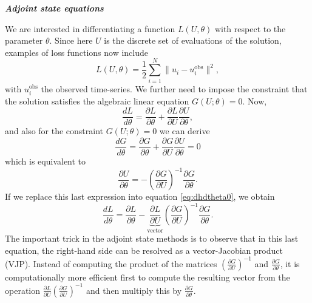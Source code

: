 \vspace*{10px}
\noindent \textbf{\textit{Adjoint state equations}}
\vspace*{5px}

We are interested in differentiating a function $L(U, \theta)$ with respect to the parameter $\theta$. 
Since here $U$ is the discrete set of evaluations of the solution, examples of loss functions now include 
\begin{equation}
    L(U, \theta) 
    = 
    \frac{1}{2} \sum_{i=1}^N \| u_i - u_i^\text{obs} \|^2, 
\end{equation}
with $u_i^\text{obs}$ the observed time-series. 
We further need to impose the constraint that the solution satisfies the algebraic linear equation $G(U; \theta) = 0$.
Now,
\begin{equation}
    \frac{dL}{d\theta} 
    = 
    \frac{\partial L}{\partial \theta} 
    + 
    \frac{\partial L}{\partial U} \frac{\partial U}{\partial \theta},
    \label{eq:dhdtheta0}
\end{equation}
and also for the constraint $G(U; \theta)=0$ we can derive
\begin{equation}
    \frac{dG}{d\theta} 
    = 
    \frac{\partial G}{\partial \theta} 
    + 
    \frac{\partial G}{\partial U} \frac{\partial U}{\partial \theta}
    =
    0
\end{equation}
which is equivalent to 
\begin{equation}
    \frac{\partial U}{\partial \theta} 
    = 
    - \left( \frac{\partial G}{\partial U} \right)^{-1} \frac{\partial G}{\partial \theta}.
\end{equation}
If we replace this last expression into equation \eqref{eq:dhdtheta0}, we obtain
\begin{equation}
    \frac{dL}{d\theta} 
    =
    \frac{\partial L}{\partial \theta} 
    - 
    \underbrace{\frac{\partial L}{\partial U}}_{\text{vector}}
    \left( \frac{\partial G}{\partial U} \right)^{-1} 
    \frac{\partial G}{\partial \theta}.
    \label{eq:dhdtheta}
\end{equation}
The important trick in the adjoint state methods is to observe that in this last equation, the right-hand side can be resolved as a vector-Jacobian product (VJP).
Instead of computing the product of the matrices $\left( \frac{\partial G}{\partial U} \right)^{-1}$ and $\frac{\partial G}{\partial \theta}$, it is computationally more efficient first to compute the resulting vector from the operation $\frac{\partial L}{\partial U} \left( \frac{\partial G}{\partial U} \right)^{-1}$ and then multiply this by $\frac{\partial G}{\partial \theta}$.
